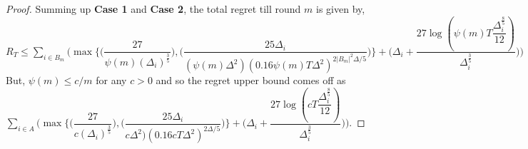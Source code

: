 \begin{proof}
\newline
Summing up \textbf{Case 1} and \textbf{Case 2}, the total regret till round $m$ is given by,
\newline $R_{T}\leq \sum_{i\in B_{m}}\bigg (\max{\bigg\lbrace \bigg(\dfrac{27}{\psi(m)(\Delta_{i})^{\frac{3}{5}}}\bigg) ,\bigg(\dfrac{25\Delta_{i}}{(\psi(m)\Delta^{2})(0.16\psi(m)T\Delta^{2})^{2|B_{m}|^{2}\Delta/5}}\bigg)\bigg\rbrace} + \bigg(\Delta_{i}+\dfrac{27\log{(\psi(m)T\dfrac{\Delta_{i}^{\frac{8}{5}}}{12})}}{\Delta_{i}^{\frac{3}{5}}}\bigg)\bigg)$
\newline
But, $\psi(m)\leq c/m$ for any $c>0$ and so the regret upper bound comes off as 
\newline
$\sum_{i\in A}\bigg (\max{\bigg\lbrace \bigg(\dfrac{27}{c(\Delta_{i})^{\frac{3}{5}}}\bigg) ,\bigg(\dfrac{25\Delta_{i}}{c\Delta^{2})(0.16cT\Delta^{2})^{2\Delta/5}}\bigg)\bigg\rbrace} + \bigg(\Delta_{i}+\dfrac{27\log{(cT\dfrac{\Delta_{i}^{\frac{8}{5}}}{12})}}{\Delta_{i}^{\frac{3}{5}}}\bigg)\bigg)$.

\end{proof}

